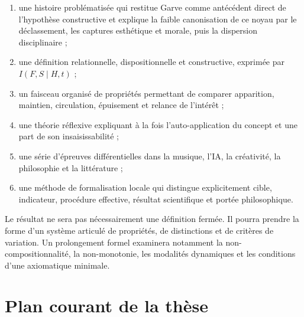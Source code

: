 \documentclass[11pt,a4paper]{article}
\begin{document}
\begin{enumerate}
  \item une histoire problématisée qui restitue Garve comme antécédent direct de
        l'hypothèse constructive et explique la faible canonisation de ce noyau
        par le déclassement, les captures esthétique et morale, puis la dispersion
        disciplinaire ;
  \item une définition relationnelle, dispositionnelle et constructive,
        exprimée par \(I(F,S\mid H,t)\) ;
  \item un faisceau organisé de propriétés permettant de comparer apparition,
        maintien, circulation, épuisement et relance de l'intérêt ;
  \item une théorie réflexive expliquant à la fois l'auto-application du concept
        et une part de son insaisissabilité ;
  \item une série d'épreuves différentielles dans la musique, l'IA, la
        créativité, la philosophie et la littérature ;
  \item une méthode de formalisation locale qui distingue explicitement cible,
        indicateur, procédure effective, résultat scientifique et portée
        philosophique.
\end{enumerate}

Le résultat ne sera pas nécessairement une définition fermée. Il pourra prendre
la forme d'un système articulé de propriétés, de distinctions et de critères de
variation. Un prolongement formel examinera notamment la
non-compositionnalité, la non-monotonie, les modalités dynamiques et les
conditions d'une axiomatique minimale.

\section{Plan courant de la thèse}
\end{document}
